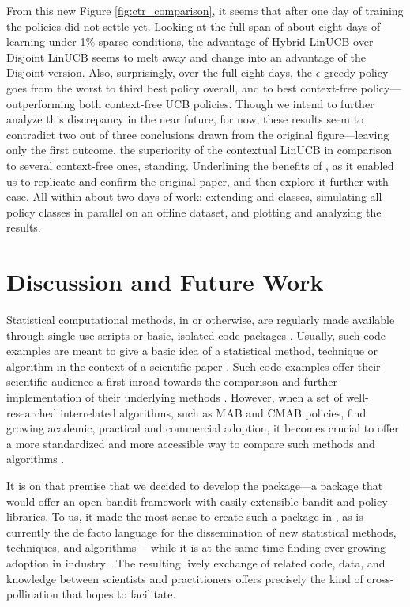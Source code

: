 \documentclass{jss}
\begin{document}
From this new Figure \ref{fig:ctr_comparison}, it seems that after one day of training the policies did not settle yet. Looking at the full span of about eight days of learning under 1\% sparse conditions, the advantage of Hybrid LinUCB over Disjoint LinUCB seems to melt away and change into an advantage of the Disjoint version. Also, surprisingly, over the full eight days, the $\epsilon$-greedy policy goes from the worst to third best policy overall, and to best context-free policy---outperforming both context-free UCB policies. Though we intend to further analyze this discrepancy in the near future, for now, these results seem to contradict two out of three conclusions drawn from the original figure---leaving only the first outcome, the superiority of the contextual LinUCB in comparison to several context-free ones, standing. Underlining the benefits of , as it enabled us to replicate and confirm the original \cite{Li2010} paper, and then explore it further with ease. All within about two days of work: extending  and  classes, simulating all policy classes in parallel on an offline dataset, and plotting and analyzing the results.

\section{Discussion and Future Work} \label{future}

Statistical computational methods, in  or otherwise, are regularly made available through single-use scripts or basic, isolated code packages \citep{Gandrud2016}. Usually, such code examples are meant to give a basic idea of a statistical method, technique or algorithm in the context of a scientific paper \citep{Stodden2013}. Such code examples offer their scientific audience a first inroad towards the comparison and further implementation of their underlying methods \citep{Buckheit1995}. However, when a set of well-researched interrelated algorithms, such as MAB and CMAB policies, find growing academic, practical and commercial adoption, it becomes crucial to offer a more standardized and more accessible way to compare such methods and algorithms \citep{Mesirov2010}.

It is on that premise that we decided to develop the   package---a package that would offer an open bandit framework with easily extensible bandit and policy libraries. To us, it made the most sense to create such a package in  \citep{RCore}, as  is currently the de facto language for the dissemination of new statistical methods, techniques, and algorithms \citep{Tippmann2015}---while it is at the same time finding ever-growing adoption in industry \citep{2012}. The resulting lively exchange of  related code, data, and knowledge between scientists and practitioners offers precisely the kind of cross-pollination that  hopes to facilitate.
\end{document}
